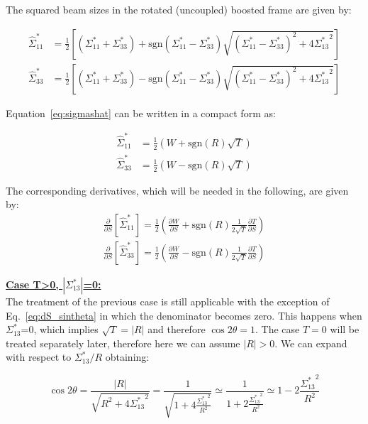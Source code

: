 The squared beam sizes in the rotated (uncoupled) boosted frame are given by:

\begin{align}
\hat{\Sigma}^*_{11} &= \frac{1}{2}\left[ \left(\Sigma^*_{11} + \Sigma^*_{33}\right) +\textrm{sgn}\left(\Sigma^*_{11} - \Sigma^*_{33}\right)\sqrt{\left(\Sigma^*_{11} - \Sigma^*_{33}\right)^2 + 4 {\Sigma^*_{13}}^2 }\right] \\
\hat{\Sigma}^*_{33} &= \frac{1}{2}\left[ \left(\Sigma^*_{11} + \Sigma^*_{33}\right) -\textrm{sgn}\left(\Sigma^*_{11} - \Sigma^*_{33}\right)\sqrt{\left(\Sigma^*_{11} - \Sigma^*_{33}\right)^2 + 4 {\Sigma^*_{13}}^2 }\right] 
\label{eq:sigmashat}
\end{align}


Equation~\ref{eq:sigmashat} can be written in a compact form as:

\begin{align}
\hat{\Sigma}^*_{11} &= \frac{1}{2}\left(W + \textrm{sgn}(R)\sqrt{T} \right)\\
\hat{\Sigma}^*_{33} &= \frac{1}{2}\left(W - \textrm{sgn}(R)\sqrt{T} \right) \label{eq:Sigmashat}
\end{align}

The corresponding derivatives, which will be needed in the following, are given by:
\begin{align}
\frac{\partial }{\partial S} \left[\hat{\Sigma}^*_{11} \right] = \frac{1}{2}\left(\frac{\partial W}{\partial S} + \textrm{sgn}(R)\frac{1}{2\sqrt{T}}\frac{\partial T}{\partial S}  \right)\\
\frac{\partial }{\partial S} \left[\hat{\Sigma}^*_{33} \right] = \frac{1}{2}\left(\frac{\partial W}{\partial S} - \textrm{sgn}(R)\frac{1}{2\sqrt{T}}\frac{\partial T}{\partial S}  \right)\label{eq:dS_Sigmas}
\end{align}

\textbf{\underline{Case T>0, $\left|\Sigma^*_{13}\right|$=0:}}
~\\

The treatment of the previous case is still applicable with the exception of Eq.~\ref{eq:dS_sintheta} in which the denominator becomes zero.
This happens when $\Sigma^*_{13}$=0, which implies $\sqrt{T}=\left| R \right|$ and therefore $\cos 2 \theta = 1$. The case $T=0$ will be treated separately later, therefore here we can assume $\left| R \right|>0$. We can expand with respect to ${\Sigma^*_{13}}/{R}$ obtaining:

\begin{equation}
\cos 2 \theta = \frac{\left| R \right|}{\sqrt{R^2+4 {\Sigma^*_{13}}^2}} = \frac{1}{\sqrt{1+4 \frac{{\Sigma^*_{13}}^2}{R^2}}} \simeq \frac{1}{1+2 \frac{{\Sigma^*_{13}}^2}{R^2}} \simeq 1-2 \frac{{\Sigma^*_{13}}^2}{R^2}
\end{equation}

